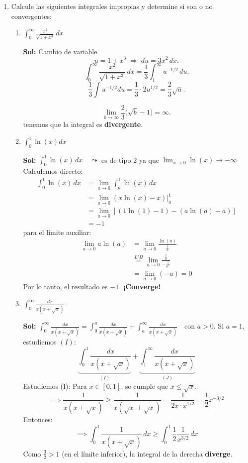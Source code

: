 \documentclass[letterpaper,12pt]{article}
\theoremstyle{plain}
\theoremstyle{definition}
\begin{document}
\begin{enumerate}
\item Calcule las siguientes integrales impropias y determine si son o no convergentes:
    \begin{enumerate}
        \item $\displaystyle \int_0^{\infty} \frac{x^2}{\sqrt{1 + x^3}} \, dx$

\color{blue}
\textbf{Sol:} Cambio de variable
\[
u=1+x^3 \;\Rightarrow\; du=3x^2\,dx.
\]
\[
\int_0^{\infty}\frac{x^2}{\sqrt{1+x^3}}\,dx
=\frac{1}{3}\int_{1}^{\infty} u^{-1/2}\,du.
\]
\[
\frac{1}{3}\int u^{-1/2}du
=\frac{1}{3}\cdot 2u^{1/2}
=\frac{2}{3}\sqrt{u}.
\]

\[
\lim_{b\to\infty}\frac{2}{3}\big(\sqrt{b}-1\big)=\infty.
\]
tenemos que la integral es \textbf{divergente}.
\color{black}
        
        \item $\displaystyle \int_0^1 \ln(x)dx$

\color{blue}
\textbf{Sol:} $\displaystyle \int_{0}^{1} \ln(x) \, dx \quad \leadsto$ es de tipo 2 ya que $\displaystyle \lim_{x \to 0} \ln(x) \to -\infty$
Calculemos directo:
\begin{align*}
\int_{0}^{1} \ln(x) \, dx &= \lim_{a \to 0} \int_{a}^{1} \ln(x) \, dx \\
&= \lim_{a \to 0} (x \ln(x) - x) \bigg|_{a}^{1} \\
&= \lim_{a \to 0} \left[ (1 \ln(1) - 1) - (a \ln(a) - a) \right] \\
&= -1
\end{align*}
para el límite auxiliar:
\[
\begin{aligned}
\lim_{a \to 0} a \ln(a) &= \lim_{a \to 0} \frac{\ln(a)}{\frac{1}{a}} \\
&\stackrel{L'H}{=} \lim_{a \to 0} \frac{\frac{1}{a}}{-\frac{1}{a^2}} \\
&= \lim_{a \to 0} (-a) = 0
\end{aligned}
\]
Por lo tanto, el resultado es $-1$. \textbf{¡Converge!}
\color{black}
        
        \item $\displaystyle \int_0^{\infty} \frac{dx}{x(x+\sqrt{x})}$

\color{blue}
\textbf{Sol:} $\displaystyle \int_{0}^{\infty} \frac{dx}{x(x+\sqrt{x})} = \int_{0}^{a} \frac{dx}{x(x+\sqrt{x})} + \int_{a}^{\infty} \frac{dx}{x(x+\sqrt{x})} \quad \text{con } a > 0$.  Si $a = 1$, estudiemos $(I)$:
\[ \underbrace{\int_{0}^{1} \frac{dx}{x(x+\sqrt{x})}}_{(I)} + \underbrace{\int_{1}^{\infty} \frac{dx}{x(x+\sqrt{x})}}_{(J)} \]
Estudiemos (I): Para $x \in [0, 1]$, se cumple que $x \leq \sqrt{x}$.
\[ \implies \frac{1}{x(x+\sqrt{x})} \geq \frac{1}{x(\sqrt{x}+\sqrt{x})} = \frac{1}{2x \cdot x^{1/2}} = \frac{1}{2} x^{-3/2} \]
Entonces:
\[ \implies \int_{0}^{1} \frac{1}{x(x+\sqrt{x})} \, dx \geq \int_{0}^{1} \frac{1}{2} \frac{1}{x^{3/2}} \, dx \]
Como $\frac{3}{2} > 1$ (en el límite inferior), la integral de la derecha \textbf{diverge}.


\end{enumerate}
\end{enumerate}
\end{document}
